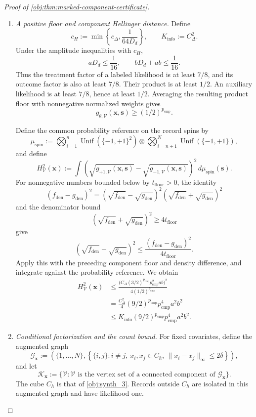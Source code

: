 \documentclass[11pt]{article}
\begin{document}
\begin{proof}[Proof of \cref{obj:thm:marked-component-certificate}]
\begin{enumerate}
\item \textit{A positive floor and component Hellinger distance.}
Define
\[
c_H:=\min\left\{c_\Delta,\frac1{64D_d}\right\},
\qquad
K_{\mathrm{info}}:=C_\Delta^2.
\]
Under the amplitude inequalities with \(c_H\),
\[
aD_d\le\frac1{16},
\qquad
bD_d+ab\le\frac1{16}.
\]
Thus the treatment factor of a labeled likelihood is at least \(7/8\), and its outcome factor is also at least \(7/8\). Their product is at least \(1/2\). An auxiliary likelihood is at least \(7/8\), hence at least \(1/2\). Averaging the resulting product floor with nonnegative normalized weights gives
\[
g_{\theta,\mathcal V}(\mathbf x,\mathbf s)
\ge(1/2)^{p_{\mathrm{cmp}}}.
\]

Define the common probability reference on the record spins by
\[
\mu_{\mathrm{spin}}
:=
\bigotimes_{i=1}^{n}\operatorname{Unif}(\{-1,+1\}^2)
\otimes
\bigotimes_{i=n+1}^{N}\operatorname{Unif}(\{-1,+1\}),
\]
and define
\[
H_{\mathcal V}^2(\mathbf x)
:=
\int
\left(
\sqrt{g_{+1,\mathcal V}(\mathbf x,\mathbf s)}
-\sqrt{g_{-1,\mathcal V}(\mathbf x,\mathbf s)}
\right)^2
\,d\mu_{\mathrm{spin}}(\mathbf s).
\]
For nonnegative numbers bounded below by \(t_{\mathrm{floor}}>0\), the identity
\[
(f_{\mathrm{den}}-g_{\mathrm{den}})^2
=
(\sqrt{f_{\mathrm{den}}}-\sqrt{g_{\mathrm{den}}})^2
(\sqrt{f_{\mathrm{den}}}+\sqrt{g_{\mathrm{den}}})^2
\]
and the denominator bound
\[
(\sqrt{f_{\mathrm{den}}}+\sqrt{g_{\mathrm{den}}})^2
\ge4t_{\mathrm{floor}}
\]
give
\[
(\sqrt{f_{\mathrm{den}}}-\sqrt{g_{\mathrm{den}}})^2
\le
\frac{(f_{\mathrm{den}}-g_{\mathrm{den}})^2}{4t_{\mathrm{floor}}}.
\]
Apply this with the preceding component floor and density difference, and integrate against the probability reference. We obtain
\[
\begin{aligned}
H_{\mathcal V}^2(\mathbf x)
&\le
\frac{
\bigl(C_\Delta(3/2)^{p_{\mathrm{cmp}}}
p_{\mathrm{cmp}}^2ab\bigr)^2
}{
4(1/2)^{p_{\mathrm{cmp}}}
}\\
&=
\frac{C_\Delta^2}{4}(9/2)^{p_{\mathrm{cmp}}}
p_{\mathrm{cmp}}^4a^2b^2\\
&\le
K_{\mathrm{info}}(9/2)^{p_{\mathrm{cmp}}}
p_{\mathrm{cmp}}^4a^2b^2.
\end{aligned}
\]

\item \textit{Conditional factorization and the count bound.}
For fixed covariates, define the augmented graph
\[
\mathscr G_{\mathbf x}
:=
\left(
\{1,\ldots,N\},
\left\{\{i,j\}:
i\ne j,\ x_i,x_j\in C_h,\
\|x_i-x_j\|_\infty\le2\delta
\right\}
\right),
\]
and let
\[
\mathscr K_{\mathbf x}
:=
\{\mathcal V:\mathcal V
\text{ is the vertex set of a connected component of }
\mathscr G_{\mathbf x}\}.
\]
The cube \(C_h\) is that of \cref{obj:synth_3}. Records outside \(C_h\) are isolated in this augmented graph and have likelihood one.


\end{enumerate}
\end{proof}
\end{document}
